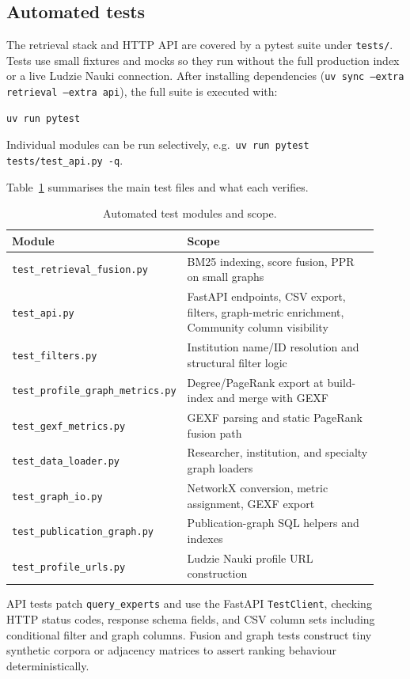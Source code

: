 \documentclass{article}
\begin{document}
\subsection{Automated tests}

The retrieval stack and HTTP API are covered by a pytest suite under \texttt{tests/}. Tests use small fixtures and mocks so they run without the full production index or a live Ludzie Nauki connection. After installing dependencies (\texttt{uv sync --extra retrieval --extra api}), the full suite is executed with:
\begin{verbatim}
uv run pytest
\end{verbatim}
Individual modules can be run selectively, e.g.\ \texttt{uv run pytest tests/test\_api.py -q}.

Table~\ref{tab:test-modules} summarises the main test files and what each verifies.

\begin{table}[htbp]
  \centering
  \caption{Automated test modules and scope.}
  \label{tab:test-modules}
  \small
  \begin{tabular}{@{}p{0.38\linewidth}p{0.54\linewidth}@{}}
    \toprule
    Module & Scope \\
    \midrule
    \texttt{test\_retrieval\_fusion.py} & BM25 indexing, score fusion, PPR on small graphs \\
    \texttt{test\_api.py} & FastAPI endpoints, CSV export, filters, graph-metric enrichment, Community column visibility \\
    \texttt{test\_filters.py} & Institution name/ID resolution and structural filter logic \\
    \texttt{test\_profile\_graph\_metrics.py} & Degree/PageRank export at build-index and merge with GEXF \\
    \texttt{test\_gexf\_metrics.py} & GEXF parsing and static PageRank fusion path \\
    \texttt{test\_data\_loader.py} & Researcher, institution, and specialty graph loaders \\
    \texttt{test\_graph\_io.py} & NetworkX conversion, metric assignment, GEXF export \\
    \texttt{test\_publication\_graph.py} & Publication-graph SQL helpers and indexes \\
    \texttt{test\_profile\_urls.py} & Ludzie Nauki profile URL construction \\
    \bottomrule
  \end{tabular}
\end{table}

API tests patch \texttt{query\_experts} and use the FastAPI \texttt{TestClient}, checking HTTP status codes, response schema fields, and CSV column sets including conditional filter and graph columns. Fusion and graph tests construct tiny synthetic corpora or adjacency matrices to assert ranking behaviour deterministically.


\printbibliography
\end{document}
